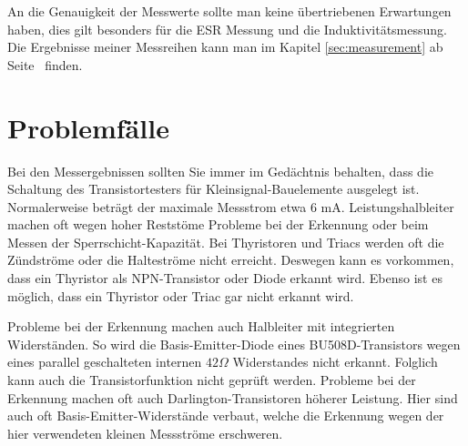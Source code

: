 An die Genauigkeit der Messwerte sollte man keine übertriebenen Erwartungen haben, dies gilt besonders
für die ESR Messung und die Induktivitätsmessung.
Die Ergebnisse meiner Messreihen kann man im Kapitel \ref{sec:measurement} ab Seite~\pageref{sec:measurement} finden.



\section{Problemfälle}
Bei den Messergebnissen sollten Sie immer im Gedächtnis behalten, dass die Schaltung des Transistortesters für
Kleinsignal-Bauelemente ausgelegt ist. Normalerweise beträgt der maximale Messstrom etwa 6 mA.
Leistungshalbleiter machen oft wegen hoher Reststöme Probleme bei der Erkennung oder beim Messen der
Sperrschicht-Kapazität.
Bei Thyristoren und Triacs werden oft die Zündströme oder die Halteströme nicht erreicht. Deswegen kann es
vorkommen, dass ein Thyristor als NPN-Transistor oder Diode erkannt wird. Ebenso ist es möglich, dass ein 
Thyristor oder Triac gar nicht erkannt wird.

Probleme bei der Erkennung machen auch Halbleiter mit integrierten Widerständen.
So wird die Basis-Emitter-Diode eines BU508D-Transistors wegen eines parallel geschalteten internen
\(42 \Omega\) Widerstandes nicht erkannt.
Folglich kann auch die Transistorfunktion nicht geprüft werden.
Probleme bei der Erkennung machen oft auch Darlington-Transistoren höherer Leistung. Hier sind auch
oft Basis-Emitter-Widerstände verbaut, welche die Erkennung wegen der hier verwendeten kleinen Messströme erschweren.

